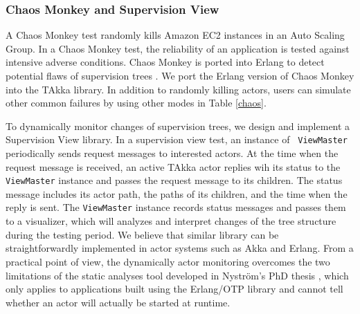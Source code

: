 \subsubsection {Chaos Monkey and Supervision View}

A Chaos Monkey test \citep{ChaosMonkey} randomly kills Amazon EC2 instances in 
an Auto Scaling Group.  In a Chaos Monkey test, the 
reliability of an application is tested against intensive adverse 
conditions.  Chaos Monkey is ported into Erlang to detect potential flaws of 
supervision trees \citep{ErlangChaosMonkey}.  We port the Erlang version of 
Chaos 
Monkey into the TAkka library.  In addition to randomly killing actors, users 
can simulate other common failures by using other modes in Table \ref{chaos}.


To dynamically monitor changes of supervision trees, we design and implement 
a Supervision View library. In a supervision view test, an instance of {\tt 
ViewMaster} periodically sends request messages to interested actors.  At the 
time when the request message is received, an active TAkka actor replies wih 
its status to the {\tt ViewMaster} instance and passes the request message to 
its children.  The status message includes its actor path, the paths of its 
children, and the time when the reply is sent.  The {\tt ViewMaster} instance 
records status messages and passes them to a visualizer, which will analyzes 
and 
interpret changes of the tree structure during the testing period.  We believe 
that similar library can be straightforwardly implemented in actor systems such 
as Akka and Erlang.  From a practical point of view, the dynamically actor 
monitoring overcomes the two limitations of the static analyses tool 
developed in Nyström's PhD thesis \citep{JanHenry}, which only applies to 
applications built using the Erlang/OTP library and cannot tell whether 
an actor will actually be started at runtime.



